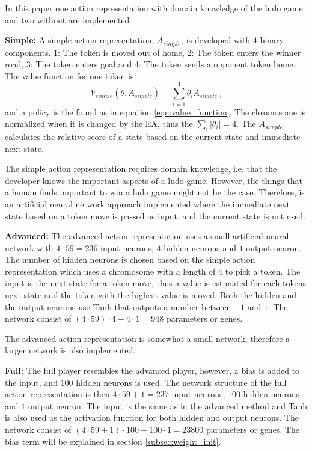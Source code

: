 \documentclass{llncs}
\begin{document}
In this paper one action representation with domain knowledge of the ludo game and two without are implemented.

\textbf{Simple:} A simple action representation, $A_{simple}$, is developed with $4$ binary components. 1: The token is moved out of home, 2: The token enters the winner road, 3: The token enters goal and 4: The token sends a opponent token home. The value function for one token is
\begin{equation}
V_{simple}(\theta, A_{simple}) = \sum_{i=1}^{4} \theta_{i} A_{simple, i}
\label{eqn:value_simple}
\end{equation}
and a policy is the found as in equation \ref{eqn:value_function}. The chromosome is normalized when it is changed by the EA, thus the $\sum_i |\theta_i| = 4$. The $A_{simple}$ calculates the relative score of a state based on the current state and immediate next state.

The simple action representation requires domain knowledge, i.e. that the developer knows the important aspects of a ludo game. However, the things that a human finds important to win a ludo game might not be the case. Therefore, is an artificial neural network approach implemented where the immediate next state based on a token move is passed as input, and the current state is not used.

\textbf{Advanced:} The advanced action representation uses a small artificial neural network with $4 \cdot 59 = 236$ input neurons, $4$ hidden neurons and $1$ output neuron. The number of hidden neurons is chosen based on the simple action representation which uses a chromosome with a length of $4$ to pick a token. The input is the next state for a token move, thus a value is estimated for each tokens next state and the token with the highest value is moved. Both the hidden and the output neurons use Tanh that outputs a number between $-1$ and $1$. The network consist of $(4 \cdot 59) \cdot 4 + 4 \cdot 1 = 948$ parameters or genes.

The advanced action representation is somewhat a small network, therefore a larger network is also implemented.

\textbf{Full:} The full player resembles the advanced player, however, a bias is added to the input, and $100$ hidden neurons is used. The network structure of the full action representation is then $4 \cdot 59 + 1 = 237$ input neurons, $100$ hidden neurons and $1$ output neuron. The input is the same as in the advanced method and Tanh is also used as the activation function for both hidden and output neurons. The network consist of $(4 \cdot 59 + 1) \cdot 100 + 100 \cdot 1 = 23800$ parameters or genes. The bias term will be explained in section \ref{subsec:weight_init}.
\end{document}
